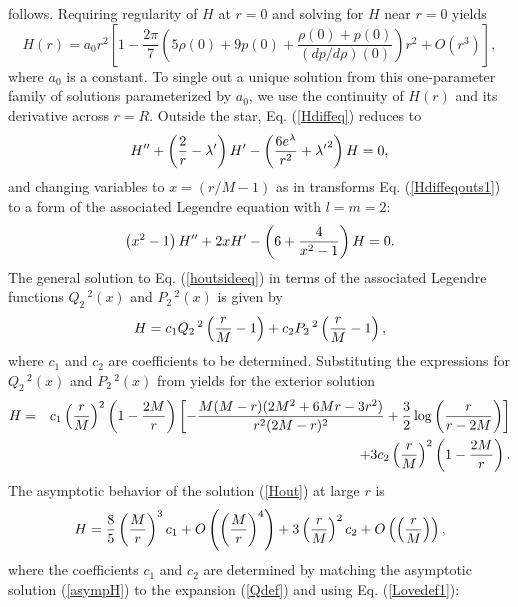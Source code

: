 \documentclass[12pt,preprint]{aastex}
\begin{document}
{follows. Requiring regularity of $H$ at $r=0$ and solving for $H$
near $r=0$ yields \begin{equation} H(r)=a_0
r^2\left[1-\frac{2\pi}{7}\left(5\rho(0)+9p(0)+\frac{\rho(0)+p(0)}{(dp/d\rho)(0)}\right)r^2+
O(r^3)\right], \label{horigin}\end{equation} where $a_0$ is a
constant. To single out a unique solution from this one-parameter
family of solutions parameterized by $a_0$, we use the continuity of
$H(r)$ and its derivative across $r=R$. Outside the star, Eq.
(\ref{Hdiffeq}) reduces to
\begin{equation}
H{''} + \left( {2\over r} - \lambda{'}\right) H{'} -\left( {6
e^{\lambda} \over r^2 } + \lambda{'}^2 \right) H= 0,
\label{Hdiffeqouts1}
\end{equation}
and changing variables to $x =( r/M -1)$ as in \citet{tc} transforms
Eq. (\ref{Hdiffeqouts1}) to a form of the associated Legendre
equation with $l=m=2$:
\begin{equation}
\left(x^2 -1 \right) H{''} + 2 x H{'} - \left( 6 + {4\over x^2 -1 }
\right)H=0.\label{houtsideeq}
\end{equation}
The general solution to Eq. (\ref{houtsideeq}) in terms of the
associated Legendre functions $Q_2{\,}^2(x)$ and $P_2{\,}^2(x)$ is
given by
\begin{equation}H = c_1 Q_2{\,}^2 \left( {r \over M}-1 \right) + c_2
P_2{\,}^2\left( {r \over M}-1 \right),
\end{equation}
where $c_1$ and $c_2$ are coefficients to be determined.
Substituting the expressions for $Q_2{\,}^2(x)$ and $P_2{\,}^2(x)$
from \citet{as} yields for the exterior solution \begin{eqnarray}
H&=&c_1 \left({r \over M}\right)^2\left(1-{2M \over r} \right)
\left[ -{M(M-r)(2M^2+6Mr-3r^2)\over r^2(2M-r)^2} + {3 \over 2}
\log{\left({r \over r-2M}\right)} \right]\nonumber\\
&&+  3 c_2  \left({r \over M}\right)^2\left(1-{2M \over r} \right).
\label{Hout}\end{eqnarray} The asymptotic behavior of the solution
(\ref{Hout}) at large $r$ is
\begin{equation} H = {8 \over 5} \left({M \over
r}\right)^3 c_1+O\left(\left(\frac{M}{r}\right)^4\right) + 3\left({r
\over M}\right)^2
c_2+O\left(\left(\frac{r}{M}\right)\right)\label{asympH},\end{equation}
where the coefficients $c_1$ and $c_2$ are determined by matching
the asymptotic solution (\ref{asympH}) to the expansion (\ref{Qdef})
and using Eq. (\ref{Lovedef1}):
}
\end{document}
